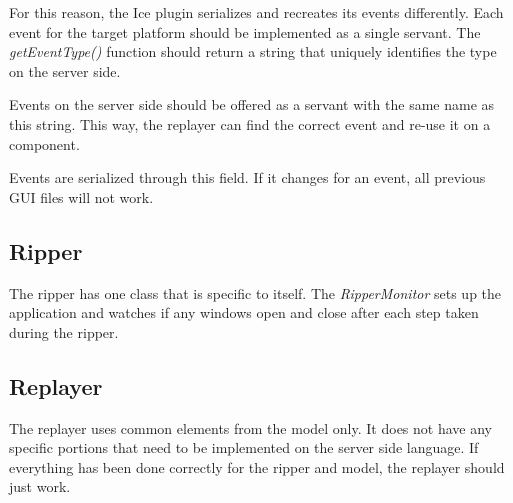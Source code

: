 For this reason, the Ice plugin serializes and recreates its events differently. Each event for the target platform should be implemented as a single servant. The \emph{getEventType()} function should return a string that uniquely identifies the type on the server side.

Events on the server side should be offered as a servant with the same name as this string. This way, the replayer can find the correct event and re-use it on a component.

Events are serialized through this field. If it changes for an event, all previous GUI files will not work.

\subsection{Ripper}

The ripper has one class that is specific to itself. The \emph{RipperMonitor} sets up the application and watches if any windows open and close after each step taken during the ripper.

\subsection{Replayer}

The replayer uses common elements from the model only. It does not have any specific portions that need to be implemented on the server side language. If everything has been done correctly for the ripper and model, the replayer should just work.

